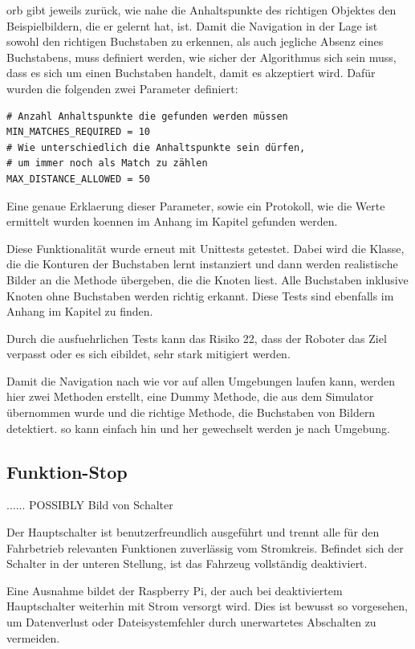 \acrshort{orb} gibt jeweils zurück, wie nahe die Anhaltspunkte des richtigen Objektes den Beispielbildern, die er gelernt hat, ist. Damit die Navigation in der Lage ist sowohl den richtigen Buchstaben zu erkennen, als auch jegliche Absenz eines Buchstabens, muss definiert werden, wie sicher der Algorithmus sich sein muss, dass es sich um einen Buchstaben handelt, damit es akzeptiert wird. Dafür wurden die folgenden zwei Parameter definiert:
\begin{verbatim}
# Anzahl Anhaltspunkte die gefunden werden müssen
MIN_MATCHES_REQUIRED = 10
# Wie unterschiedlich die Anhaltspunkte sein dürfen,
# um immer noch als Match zu zählen
MAX_DISTANCE_ALLOWED = 50
\end{verbatim}

Eine genaue Erklaerung dieser Parameter, sowie ein Protokoll, wie die Werte ermittelt wurden koennen im Anhang im Kapitel  gefunden werden.

Diese Funktionalität wurde erneut mit Unittests getestet.
Dabei wird die Klasse, die die Konturen der Buchstaben lernt instanziert und dann werden realistische Bilder an die Methode übergeben, die die Knoten liest. Alle Buchstaben inklusive Knoten ohne Buchstaben werden richtig erkannt. Diese Tests sind ebenfalls im Anhang im Kapitel  zu finden.

Durch die ausfuehrlichen Tests kann das Risiko 22, dass der Roboter das Ziel verpasst oder es sich eibildet, sehr stark mitigiert werden.

Damit die Navigation nach wie vor auf allen Umgebungen laufen kann, werden hier zwei Methoden erstellt, eine Dummy Methode, die aus dem Simulator übernommen wurde und die richtige Methode, die Buchstaben von Bildern detektiert. so kann einfach hin und her gewechselt werden je nach Umgebung.


\newpage
\subsection{Funktion-Stop}

...... POSSIBLY Bild von Schalter

Der Hauptschalter ist benutzerfreundlich ausgeführt und trennt alle für den Fahrbetrieb relevanten Funktionen zuverlässig vom Stromkreis. Befindet sich der Schalter in der unteren Stellung, ist das Fahrzeug vollständig deaktiviert.

Eine Ausnahme bildet der Raspberry Pi, der auch bei deaktiviertem Hauptschalter weiterhin mit Strom versorgt wird. Dies ist bewusst so vorgesehen, um Datenverlust oder Dateisystemfehler durch unerwartetes Abschalten zu vermeiden.


